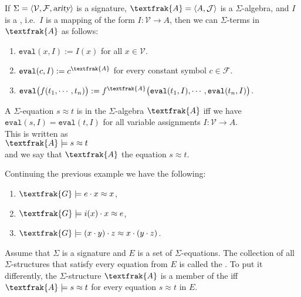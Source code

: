 \begin{Definition}
  If $\Sigma = \langle \mathcal{V}, \mathcal{F}, \textsl{arity} \rangle$ is a signature,
  $\textfrak{A} = \pair(A, \mathcal{J})$ is a $\Sigma$-algebra, and $I$ is a , i.e.~$I$
  is a mapping of the form $I:\mathcal{V} \rightarrow A$,
  then we can  $\Sigma$-terms in $\textfrak{A}$ as follows:
  \begin{enumerate}
  \item $\texttt{eval}(x, I) := I(x)$ \quad for all $x \in \mathcal{V}$.
  \item $\texttt{eval}(c, I) := c^\textfrak{A}$ \quad for every constant symbol $c \in \mathcal{F}$.
  \item $\texttt{eval}\bigl(f(t_1,\cdots,t_n)\bigr) := f^\textfrak{A}\bigl(\texttt{eval}(t_1,I),\cdots,\texttt{eval}(t_n,I)\bigr)$.
  \end{enumerate}
  A $\Sigma$-equation $s \approx t$ is  in the $\Sigma$-algebra $\textfrak{A}$ iff we have
  \\[0.2cm]
  \hspace*{1.3cm}
  $\texttt{eval}(s,I) = \texttt{eval}(t,I)$ for all variable assignments $I:\mathcal{V} \rightarrow A$.
  \\[0.2cm]
  This is written as
  \\[0.2cm]
  \hspace*{1.3cm}
  $\textfrak{A} \models s \approx t$
  \\[0.2cm]
  and we say that $\textfrak{A}$  the equation $s \approx t$.
  \eoxs
\end{Definition}

\example
Continuing the previous example we have the following:
\begin{enumerate}
\item $\textfrak{G} \models e \cdot x \approx x$,
\item $\textfrak{G} \models i(x) \cdot x \approx e$,
\item $\textfrak{G} \models (x \cdot y) \cdot z \approx x \cdot (y \cdot z)$. \eoxs
\end{enumerate}

\begin{Definition}[$E$-Variety]
  Assume that $\Sigma$ is a signature and $E$ is a set of $\Sigma$-equations.  The collection of all
  $\Sigma$-structures that satisfy every equation from $E$ is called the .
  To put it differently, the $\Sigma$-structure $\textfrak{A}$ is a member of the  iff
  \\[0.2cm]
  \hspace*{1.3cm}
  $\textfrak{A} \models s \approx t$ \quad for every equation $s \approx t$ in $E$. \eoxs
\end{Definition}

